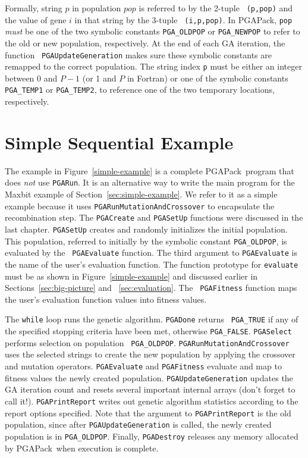 \documentclass{report}
\newcommand{\pga}{PGAPack}
\begin{document}
Formally, string $p$ in population $pop$ is referred to by the 2-tuple {\tt
(p,pop)} and the value of gene $i$ in that string by the 3-tuple {\tt
(i,p,pop)}.  In \pga, {\tt pop} {\em must} be one of the two symbolic
constants {\tt PGA\_OLDPOP} or {\tt PGA\_NEWPOP} to refer to the old or new
population, respectively.  At the end of each GA iteration, the function {\tt
PGAUpdateGeneration} makes sure these symbolic constants are remapped to the
correct population.  The string index {\tt p} must be either an integer
between 0 and $P-1$ (or 1 and $P$ in Fortran) or one of the symbolic constants
{\tt PGA\_TEMP1} or {\tt PGA\_TEMP2}, to reference one of the two temporary
locations, respectively.

\section{Simple Sequential Example}

The example in Figure~\ref{simple-example} is a complete \pga\ program that
does {\em not} use {\tt PGARun}.  It is an alternative way to write the main
program for the Maxbit example of Section~\ref{sec:simple-example}.  We refer
to it as a simple example because it uses {\tt PGARunMutationAndCrossover} to
encapsulate the recombination step.  The {\tt PGACreate} and {\tt PGASetUp}
functions were discussed in the last chapter.  {\tt PGASetUp} creates and
randomly initializes the initial population.  This population, referred to
initially by the symbolic constant {\tt PGA\_OLDPOP}, is evaluated by the {\tt
PGAEvaluate} function.  The third argument to {\tt PGAEvaluate} is the name of
the user's evaluation function.  The function prototype for {\tt evaluate}
must be as shown in Figure~\ref{simple-example} and discussed earlier in
Sections~\ref{sec:big-picture} and~ \ref{sec:evaluation}.  The {\tt
PGAFitness} function maps the user's evaluation function values into
fitness values.

The {\tt while} loop runs the genetic algorithm.  {\tt PGADone} returns {\tt
PGA\_TRUE} if any of the specified stopping criteria have been met, otherwise
{\tt PGA\_FALSE}.  {\tt PGASelect} performs selection on population {\tt
PGA\_OLDPOP}.  {\tt PGARunMutationAndCrossover} uses the selected strings to
create the new population by applying the crossover and mutation operators.
{\tt PGAEvaluate} and {\tt PGAFitness} evaluate and map to fitness values the
newly created population. {\tt PGAUpdateGeneration} updates the GA iteration
count and resets several important internal arrays (don't forget to call it!).
{\tt PGAPrintReport} writes out genetic algorithm statistics according to the
report options specified.  Note that the argument to {\tt PGAPrintReport} is
the old population, since after {\tt PGAUpdateGeneration} is called, the newly
created population is in {\tt PGA\_OLDPOP}.  Finally, {\tt PGADestroy}
releases any memory allocated by \pga\ when execution is complete.
\end{document}
